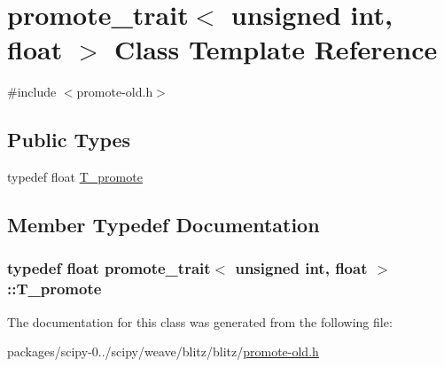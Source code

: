 \hypertarget{classpromote__trait_3_01unsigned_01int_00_01float_01_4}{}\section{promote\+\_\+trait$<$ unsigned int, float $>$ Class Template Reference}
\label{classpromote__trait_3_01unsigned_01int_00_01float_01_4}


{\ttfamily \#include $<$promote-\/old.\+h$>$}

\subsection*{Public Types}
\begin{DoxyCompactItemize}
\item 
typedef float \hyperlink{classpromote__trait_3_01unsigned_01int_00_01float_01_4_a3982df7eb48c00fde7090f9aa2282820}{T\+\_\+promote}
\end{DoxyCompactItemize}


\subsection{Member Typedef Documentation}
\hypertarget{classpromote__trait_3_01unsigned_01int_00_01float_01_4_a3982df7eb48c00fde7090f9aa2282820}{}
\subsubsection[{T\+\_\+promote}]{\setlength{\rightskip}{0pt plus 5cm}typedef float {\bf promote\+\_\+trait}$<$ unsigned int, float $>$\+::{\bf T\+\_\+promote}}\label{classpromote__trait_3_01unsigned_01int_00_01float_01_4_a3982df7eb48c00fde7090f9aa2282820}


The documentation for this class was generated from the following file\+:\begin{DoxyCompactItemize}
\item 
packages/scipy-\/0../scipy/weave/blitz/blitz/\hyperlink{promote-old_8h}{promote-\/old.\+h}\end{DoxyCompactItemize}

